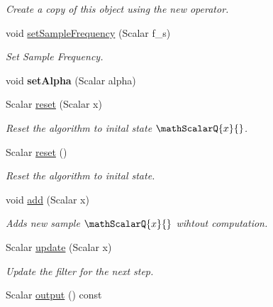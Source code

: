 \begin{DoxyCompactItemize}
\begin{DoxyCompactList}\small\item\em Create a copy of this object using the new operator. \end{DoxyCompactList}\item 
void \hyperlink{classow__core_1_1ScalarExponentialDecayFilter_a33fae2941643ba550ef85053549777f0}{set\+Sample\+Frequency} (Scalar f\+\_\+s)
\begin{DoxyCompactList}\small\item\em Set Sample Frequency. \end{DoxyCompactList}\item 
void {\bfseries set\+Alpha} (Scalar alpha)\hypertarget{classow__core_1_1ScalarExponentialDecayFilter_a4199872a77d7ebbc0e3e6b34480dc473}{}\label{classow__core_1_1ScalarExponentialDecayFilter_a4199872a77d7ebbc0e3e6b34480dc473}

\item 
Scalar \hyperlink{classow__core_1_1ScalarExponentialDecayFilter_a113edfefd3ccc71848e26c3d0f14cac8}{reset} (Scalar x)
\begin{DoxyCompactList}\small\item\em Reset the algorithm to inital state $\mathScalarQ{x}{}$. \end{DoxyCompactList}\item 
Scalar \hyperlink{classow__core_1_1ScalarExponentialDecayFilter_a2d0e8f5d3a6f29a9fce79f04c936e9bd}{reset} ()
\begin{DoxyCompactList}\small\item\em Reset the algorithm to inital state. \end{DoxyCompactList}\item 
void \hyperlink{classow__core_1_1ScalarExponentialDecayFilter_a24d0268754b58c3c33ba608c8b63984d}{add} (Scalar x)
\begin{DoxyCompactList}\small\item\em Adds new sample $\mathScalarQ{x}{}$ wihtout computation. \end{DoxyCompactList}\item 
Scalar \hyperlink{classow__core_1_1ScalarExponentialDecayFilter_ac8d2d2609ddd97ea4fa5699ed348e525}{update} (Scalar x)\hypertarget{classow__core_1_1ScalarExponentialDecayFilter_ac8d2d2609ddd97ea4fa5699ed348e525}{}\label{classow__core_1_1ScalarExponentialDecayFilter_ac8d2d2609ddd97ea4fa5699ed348e525}

\begin{DoxyCompactList}\small\item\em Update the filter for the next step. \end{DoxyCompactList}\item 
Scalar \hyperlink{classow__core_1_1ScalarExponentialDecayFilter_ab9166bb6bc577e8baf7a7b4f669e9e69}{output} () const \hypertarget{classow__core_1_1ScalarExponentialDecayFilter_ab9166bb6bc577e8baf7a7b4f669e9e69}{}\label{classow__core_1_1ScalarExponentialDecayFilter_ab9166bb6bc577e8baf7a7b4f669e9e69}


\end{DoxyCompactItemize}
